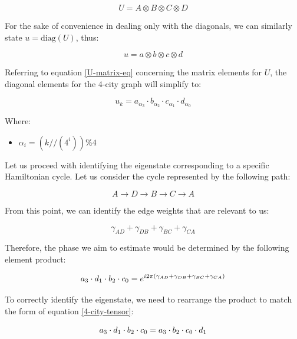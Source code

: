 \documentclass[msc,oneside]{ubcthesis}
\begin{document}
	\begin{equation}\label{4-city-matrix-tensor}
	 U = A \otimes B \otimes C \otimes D
	\end{equation}
	
	For the sake of convenience in dealing only with the diagonals, we can similarly state $ u = \mathrm{diag}(U)$, thus:
	
	$$ u = a \otimes b \otimes c \otimes d$$
	
	
	Referring to equation \ref{U-matrix-eq} concerning the matrix elements for $U$,  the diagonal elements for the 4-city graph will simplify to:
	
	\begin{equation}\label{4-city-tensor}
		u_{k} = a_{\alpha_{3}}\cdot b _{\alpha_{2}} \cdot c_{\alpha_1} \cdot d_{\alpha_{0}}
	\end{equation}
	
	Where:
	\begin{itemize}
	\item[] $\alpha_i = \left(k//\left(4^{i}\right)\right) \% 4$
	\end{itemize}
	
	Let us proceed with identifying the eigenstate corresponding to a specific Hamiltonian cycle. Let us consider the cycle represented by the following path:
	
	\begin{equation}\label{one-ham-cycle-4-city}
		A \rightarrow D \rightarrow B \rightarrow C \rightarrow A
	\end{equation}
	
	From this point, we can identify the edge weights that are relevant to us:
	
	\begin{equation*}
		\gamma_{AD} + \gamma_{DB} + \gamma_{BC} + \gamma_{CA}
	\end{equation*}
	
	Therefore, the phase we aim to estimate would be determined by the following element product:
	
	\begin{equation*}
		\Large{a_{3} \cdot d_{1} \cdot b_{2} \cdot c_{0} = e^{i2\pi (\gamma_{AD} + \gamma_{DB} + \gamma_{BC} + \gamma_{CA})}}
	\end{equation*}
	
	
	To correctly identify the eigenstate, we need to rearrange the product to match the form of equation \ref{4-city-tensor}:
	
	\begin{equation*}
		\Large{a_{3} \cdot d_{1} \cdot b_{2} \cdot c_{0} = \Large{a_{3}} \cdot b_{2} \cdot c_{0}  \cdot d_{1}}
	\end{equation*}
	
\end{document}
